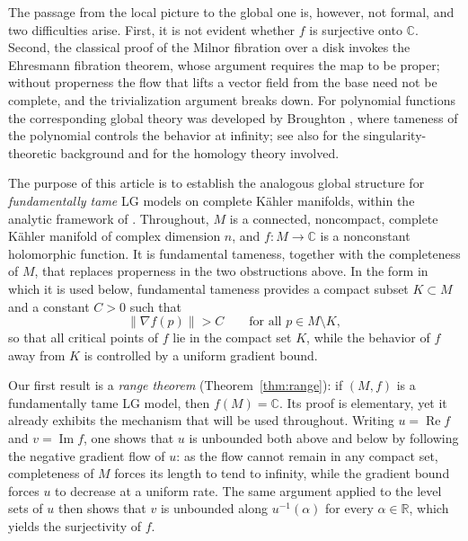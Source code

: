 \documentclass[11pt]{amsart}
\theoremstyle{plain}
\theoremstyle{definition}
\theoremstyle{remark}
\numberwithin{equation}{section}
\begin{document}
The passage from the local picture to the global one is, however, not formal, and two difficulties arise.
First, it is not evident whether $f$ is surjective onto $\mathbb{C}$.
Second, the classical proof of the Milnor fibration over a disk invokes the Ehresmann fibration theorem, whose argument requires the map to be proper; without properness the flow that lifts a vector field from the base need not be complete, and the trivialization argument breaks down.
For polynomial functions the corresponding global theory was developed by Broughton \cite{Broughton1988}, where tameness of the polynomial controls the behavior at infinity; see also \cite{arnold2012singularities,Batyrev1993,dimca1992singularities,Kulikov_1998,LeDungTrang1977} for the singularity-theoretic background and \cite{Dubrovin1990ModernIII} for the homology theory involved.

The purpose of this article is to establish the analogous global structure for \emph{fundamentally tame} LG models on complete K\"ahler manifolds, within the analytic framework of \cite{fan2011,LI2022108165,Wen2016}.
Throughout, $M$ is a connected, noncompact, complete K\"ahler manifold of complex dimension $n$, and $f:M\to\mathbb{C}$ is a nonconstant holomorphic function.
It is fundamental tameness, together with the completeness of $M$, that replaces properness in the two obstructions above.
In the form in which it is used below, fundamental tameness provides a compact subset $K\subset M$ and a constant $C>0$ such that
\begin{equation*}
    \|\nabla f(p)\| > C \qquad\text{for all } p\in M\setminus K,
\end{equation*}
so that all critical points of $f$ lie in the compact set $K$, while the behavior of $f$ away from $K$ is controlled by a uniform gradient bound.

Our first result is a \emph{range theorem} (Theorem~\ref{thm:range}): if $(M,f)$ is a fundamentally tame LG model, then $f(M)=\mathbb{C}$.
Its proof is elementary, yet it already exhibits the mechanism that will be used throughout.
Writing $u=\operatorname{Re} f$ and $v=\operatorname{Im} f$, one shows that $u$ is unbounded both above and below by following the negative gradient flow of $u$: as the flow cannot remain in any compact set, completeness of $M$ forces its length to tend to infinity, while the gradient bound forces $u$ to decrease at a uniform rate.
The same argument applied to the level sets of $u$ then shows that $v$ is unbounded along $u^{-1}(\alpha)$ for every $\alpha\in\mathbb{R}$, which yields the surjectivity of $f$.
\end{document}
